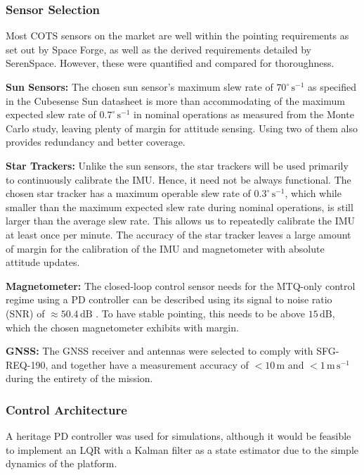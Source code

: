 \documentclass[a4paper, 11pt, conference]{IEEEtran}
\begin{document}
\subsubsection{Sensor Selection}
Most COTS sensors on the market are well within the pointing requirements as set out by Space Forge, as well as the derived requirements detailed by SerenSpace. However, these were quantified and compared for thoroughness.

\textbf{Sun Sensors:} The chosen sun sensor's maximum slew rate of $70^\circ\,\mathrm{s}^{-1}$ as specified in the Cubesense Sun datasheet \cite{cubespace-2023} is more than accommodating of the maximum expected slew rate of $0.7^\circ\,\mathrm{s}^{-1}$ in nominal operations as measured from the Monte Carlo study, leaving plenty of margin for attitude sensing. Using two of them also provides redundancy and better coverage.

\textbf{Star Trackers:} Unlike the sun sensors, the star trackers will be used primarily to continuously calibrate the IMU. Hence, it need not be always functional. The chosen star tracker has a maximum operable slew rate of $0.3^\circ\,\mathrm{s}^{-1}$, which while smaller than the maximum expected slew rate during nominal operations, is still larger than the average slew rate. This allows us to repeatedly calibrate the IMU at least once per minute. The accuracy of the star tracker leaves a large amount of margin for the calibration of the IMU and magnetometer with absolute attitude updates.

\textbf{Magnetometer:} The closed-loop control sensor needs for the MTQ-only control regime using a PD controller can be described using its signal to noise ratio (SNR) of $\approx50.4\,\mathrm{dB}$ \cite{rojas-2008}. To have stable pointing, this needs to be above $15\,\mathrm{dB}$, which the chosen magnetometer exhibits with margin.

\textbf{GNSS:} The GNSS receiver and antennas were selected to comply with SFG-REQ-190, and together have a measurement accuracy of $<10\,\mathrm{m}$ and $<1\,\mathrm{m\,s}^{-1}$ during the entirety of the mission.

\subsubsection{Control Architecture}
A heritage PD controller was used for simulations, although it would be feasible to implement an LQR with a Kalman filter as a state estimator due to the simple dynamics of the platform. 
\end{document}
